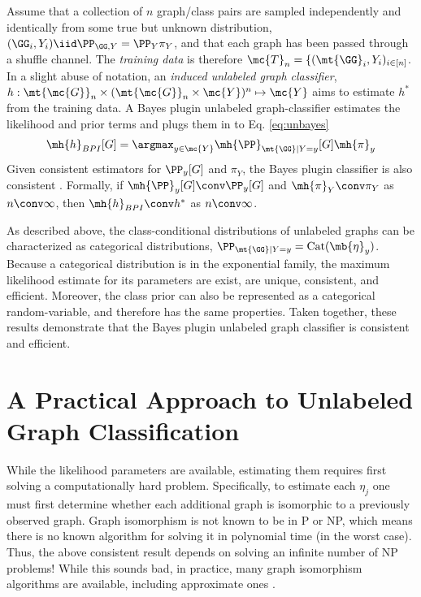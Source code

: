 \documentclass[10pt,journal,cspaper,compsoc]{IEEEtran}
\begin{document}
Assume that a collection of $n$ graph/class pairs are sampled independently and identically from some true but unknown distribution, $(\GG_i,Y_i) \iid \PP_{\GG,Y}=\PP_Y \pi_Y$, and that each graph has been passed through a shuffle channel.  The \emph{training data} is therefore  $\mc{T}_n=\{(\mt{\GG}_i,Y_i)_{i\in[n]}$. 
In a slight abuse of notation, an \emph{induced unlabeled graph classifier}, $h: \mt{\mc{G}}_n \times (\mt{\mc{G}}_n \times \mc{Y})^n \mapsto \mc{Y}$ aims to estimate $h^*$ from the training data. A Bayes plugin unlabeled graph-classifier estimates the likelihood and prior terms and plugs them in to Eq. \eqref{eq:unbayes}
\begin{align}
	\mh{h}_{BPI}[G]=\argmax_{y\in\mc{Y}} \mh{\PP}_{\mt{\GG}|Y=y}[G]\mh{\pi}_y
\end{align}
Given consistent estimators for $\PP_y[G]$ and $\pi_Y$, the Bayes plugin classifier is also consistent \cite{DGL}.  Formally, if $\mh{\PP}_y[G] \conv \PP_y[G]$ and $\mh{\pi}_Y\conv \pi_Y$ as $n \conv \infty$, then $\mh{h}_{BPI}\conv h^*$ as $n\conv \infty$.

As described above, the class-conditional distributions of unlabeled graphs can be characterized as  categorical distributions, $\PP_{\mt{\GG}|Y=y}=\text{Cat}(\mb{\eta}_y)$.  Because a categorical distribution is in the exponential family, the maximum likelihood estimate for its parameters are exist, are unique, consistent, and efficient.  Moreover, the class prior can also be represented as a categorical random-variable, and therefore has the same properties.  Taken together, these results demonstrate that the Bayes plugin unlabeled graph classifier is consistent and efficient.

\section{A Practical Approach to Unlabeled Graph Classification} %
\label{sec:a_practical_approach_to_unlabeled_graph_classification}

While the likelihood parameters are available, estimating them requires first solving a computationally hard problem.  Specifically, to estimate each $\eta_j$ one must first determine whether each additional graph is isomorphic to a previously observed graph.  Graph isomorphism is not known to be in P or NP,  which means there is no known algorithm for solving it in polynomial time (in the worst case).  Thus, the above consistent result depends on solving an infinite number of NP problems!  While this sounds bad, in practice, many graph isomorphism algorithms are available, including approximate ones \cite{Conte04}.  
\end{document}
